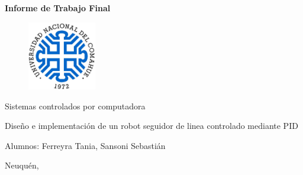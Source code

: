\documentclass[10pt,conference,a4paper,onecolumn]{article}%
\begin{document}



\begin{titlepage}
\centering
\begin{Huge}
 
\textbf{Informe de Trabajo Final}  \\

\end{Huge}


\vspace{2cm}
\begin{figure}[h]
\centering
\includegraphics[width=3cm]{./imagenes/LogoUNC}
\end{figure}

\vspace{2cm}
\normalsize
\begin{LARGE}


 Sistemas controlados por computadora \\


 
 \end{LARGE}
 \vspace{2cm}
\begin{Large}
Diseño e implementación de un robot seguidor de linea controlado mediante PID
\end{Large}
\vspace{2cm}
\normalsize 
\begin{flushleft}
Alumnos: Ferreyra Tania,  Sansoni Sebastián 

\end{flushleft}

\vspace{1cm}


\centering Neuquén, \the\year \\


\vspace{1cm}



\end{titlepage}
\end{document}
